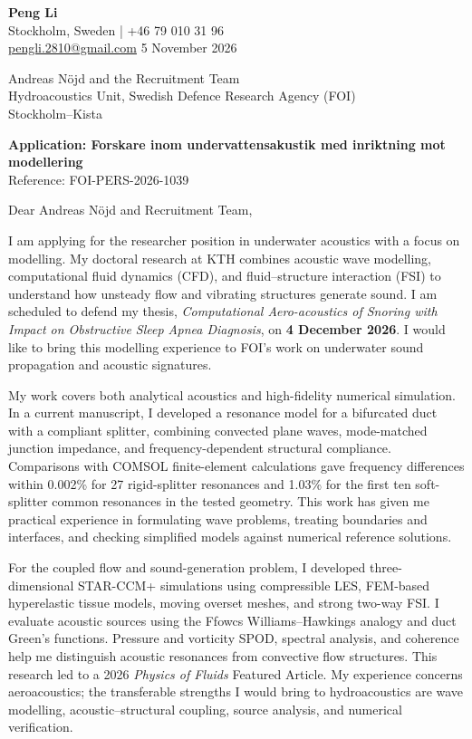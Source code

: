 \documentclass[a4paper,11pt]{article}
\begin{document}
{\LARGE\textbf{Peng Li}}\\[3pt]
Stockholm, Sweden \quad | \quad +46 79 010 31 96\\
\href{mailto:pengli.2810@gmail.com}{pengli.2810@gmail.com}
\hfill 5 November 2026

Andreas Nöjd and the Recruitment Team\\
Hydroacoustics Unit, Swedish Defence Research Agency (FOI)\\
Stockholm--Kista

\textbf{Application: Forskare inom undervattensakustik med inriktning mot modellering}\\
Reference: FOI-PERS-2026-1039

Dear Andreas Nöjd and Recruitment Team,

I am applying for the researcher position in underwater acoustics with a focus on modelling.
My doctoral research at KTH combines acoustic wave modelling, computational fluid dynamics
(CFD), and fluid--structure interaction (FSI) to understand how unsteady flow and vibrating
structures generate sound. I am scheduled to defend my thesis,
\textit{Computational Aero-acoustics of Snoring with Impact on Obstructive Sleep Apnea Diagnosis},
on \textbf{4 December 2026}. I would like to bring this modelling experience to FOI's work on
underwater sound propagation and acoustic signatures.

My work covers both analytical acoustics and high-fidelity numerical simulation.
In a current manuscript, I developed a resonance model for a bifurcated duct with a compliant
splitter, combining convected plane waves, mode-matched junction impedance, and
frequency-dependent structural compliance. Comparisons with COMSOL finite-element
calculations gave frequency differences within 0.002\% for 27 rigid-splitter resonances and
1.03\% for the first ten soft-splitter common resonances in the tested geometry.
This work has given me practical experience in formulating wave problems, treating boundaries
and interfaces, and checking simplified models against numerical reference solutions.

For the coupled flow and sound-generation problem, I developed three-dimensional
STAR-CCM+ simulations using compressible LES, FEM-based hyperelastic tissue models,
moving overset meshes, and strong two-way FSI. I evaluate acoustic sources using the
Ffowcs Williams--Hawkings analogy and duct Green's functions. Pressure and vorticity SPOD,
spectral analysis, and coherence help me distinguish acoustic resonances from convective
flow structures. This research led to a 2026 \textit{Physics of Fluids} Featured Article.
My experience concerns aeroacoustics; the transferable strengths I would bring to hydroacoustics
are wave modelling, acoustic--structural coupling, source analysis, and numerical verification.
\end{document}
